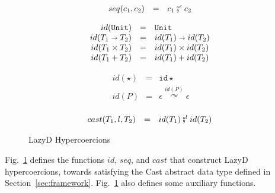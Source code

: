 \documentclass[acmsmall,review,anonymous]{acmart}\settopmatter{printfolios=true,printccs=false,printacmref=false}
\newcommand{\figref}[1]{Fig.~\ref{#1}}
\newcommand{\funrule}[3]{#1 &=& #2 & #3\\}
\newcommand{\plus}[0]{+}
\newcommand{\lazyD}{Lazy\;D}
\newcommand{\POOunit}[0]{\mathtt{Unit}}
\newcommand{\POOfun}[2]{#1 \shortrightarrow #2}
\newcommand{\POOprod}[2]{#1 \times #2}
\newcommand{\POOsum}[2]{#1 \plus #2}
\newcommand{\hyperCoercionI}[0]{\mathtt{id\star}}
\newcommand{\hyperCoercionC}[3]{#1 \overset{#2}{\curvearrowright} #3}
\begin{document}
\begin{figure}
  \[
  \begin{array}{rclr}
  \funrule{seq(c_1,c_2)}{
    c_1 \fatsemi^\epsilon c_2
  }{}
  \end{array}
  \]
  
  \[
  \begin{array}{rclr}
  \funrule{id(\POOunit)}{\POOunit}{}
  \funrule{id(\POOfun{T_1}{T_2})}{
    \POOfun{id(T_1)}{id(T_2)}
  }{}
  \funrule{id(\POOprod{T_1}{T_2})}{
    \POOprod{id(T_1)}{id(T_2)}
  }{}
  \funrule{id(\POOsum{T_1}{T_2})}{
    \POOsum{id(T_1)}{id(T_2)}
  }{}
  \end{array}
  \]
  
  \[
  \begin{array}{rclr}
  \funrule{id(\star)}{
    \hyperCoercionI
  }{}
  \funrule{id(P)}{
    \hyperCoercionC{\epsilon}{id(P)}{\epsilon}
  }{}
  \end{array}
  \]
  
  \[
  \begin{array}{rclr}
  \funrule{cast(T_1,l,T_2)}{
    id(T_1) \fatsemi^l id(T_2)
  }{}
  \end{array}
  \]
  \caption{\lazyD{} Hypercoercions}
  \label{fig:HC-D}
\end{figure}

\figref{fig:HC-D} defines the functions $id$, $seq$, and $cast$ that
construct \lazyD{} hypercoercions, towards satisfying the Cast abstract data 
type defined in Section~\ref{sec:framework}.
\figref{fig:HC-D} also defines some auxiliary functions.
\end{document}
